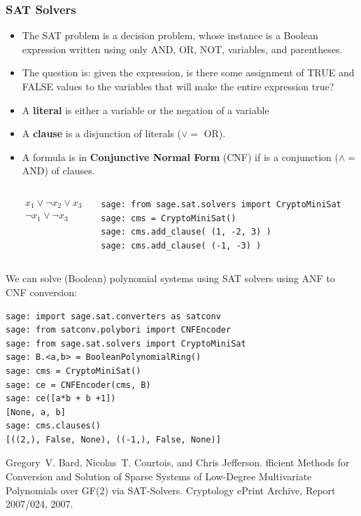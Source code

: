 \documentclass[9pt]{beamer}
\renewcommand{\emph}[1]{\textbf{\color{oxygenorange}#1}\xspace}
\begin{document}
\begin{frame}
\frametitle{SAT Solvers} 

\begin{itemize}
 \item The SAT problem is a decision problem, whose instance is a Boolean expression written using only AND, OR, NOT, variables, and parentheses.
 \item The question is: given the expression, is there some assignment of TRUE and FALSE values to the variables that will make the entire expression true? 
 \item A \emph{literal} is either a variable or the negation of a variable
 \item A \emph{clause} is a disjunction of literals ($\vee =$ OR).
 \item A formula is in \emph{Conjunctive Normal Form} (CNF) if is a conjunction ($\wedge =$  AND) of clauses.
\end{itemize}

\begin{columns}
\begin{eqnarray*}
&& x_1 \vee \neg x_2 \vee x_3\\
&& \neg x_1 \vee \neg x_3\\
\end{eqnarray*}
\begin{lstlisting}
sage: from sage.sat.solvers import CryptoMiniSat 
sage: cms = CryptoMiniSat()
sage: cms.add_clause( (1, -2, 3) )
sage: cms.add_clause( (-1, -3) )
\end{lstlisting}
\end{columns}

\framebreak

We can solve (Boolean) polynomial systems using SAT solvers using ANF to CNF conversion:

\begin{lstlisting}
sage: import sage.sat.converters as satconv
sage: from satconv.polybori import CNFEncoder
sage: from sage.sat.solvers import CryptoMiniSat 
sage: B.<a,b> = BooleanPolynomialRing()
sage: cms = CryptoMiniSat()
sage: ce = CNFEncoder(cms, B)
sage: ce([a*b + b +1])
[None, a, b]
sage: cms.clauses()
[((2,), False, None), ((-1,), False, None)]
\end{lstlisting}

\begin{small}
\begin{thebibliography}{Bard2007a}
Gregory~V. Bard, Nicolas~T. Courtois, and Chris Jefferson.
fficient {M}ethods for {C}onversion and {S}olution of {S}parse
  {S}ystems of {L}ow-{D}egree {M}ultivariate {P}olynomials over {GF(2)} via
  {SAT}-{S}olvers.
\newblock Cryptology ePrint Archive, Report 2007/024, 2007.
 \end{thebibliography}
\end{small}


\end{frame}
\end{document}

